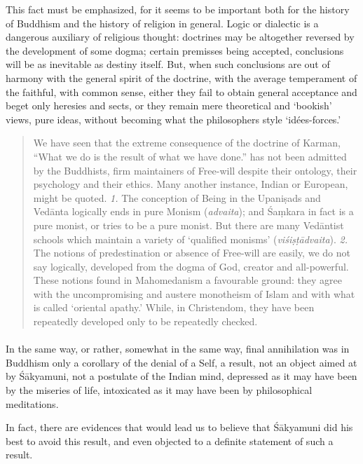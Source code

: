 \documentclass[a4paper, 11pt, oneside, english, landscape]{article}
\begin{document}
This fact must be emphasized, for it seems to be important both for the history of Buddhism and the history of religion in general. Logic or dialectic is a dangerous auxiliary of religious thought: doctrines may be altogether reversed by the development of some dogma; certain premisses being accepted, conclusions will be as inevitable as destiny itself. But, when such conclusions are out of harmony with the general spirit of the doctrine, with the average temperament of the faithful, with common sense, either they fail to obtain general acceptance and beget only heresies and sects, or they remain mere theoretical and `bookish' views, pure ideas, without becoming what the philosophers style `idées-forces.'
\begin{quotation}
\small
We have seen that the extreme consequence of the doctrine of Karman, ``What we do is the result of what we have done.'' has not been admitted by the Buddhists, firm maintainers of Free-will despite their ontology, their psychology and their ethics. Many another instance, Indian or European, might be quoted. \emph{1.} The conception of Being in the Upaniṣads and Vedānta logically ends in pure Monism (\emph{advaita}); and Śaṃkara in fact is a pure monist, or tries to be a pure monist. But there are many Vedāntist schools which maintain a variety of `qualified monisms' (\emph{viśiṣṭādvaita}). \emph{2.} The notions of predestination or absence of Free-will are easily, we do not say logically, developed from the dogma of God, creator and all-powerful. These notions found in Mahomedanism a favourable ground: they agree with the uncompromising and austere monotheism of Islam and with what is called `oriental apathy.' While, in Christendom, they have been repeatedly developed only to be repeatedly checked.
\end{quotation}
\paragraph{}
In the same way, or rather, somewhat in the same way, final annihilation was in Buddhism only a corollary of the denial of a Self, a result, not an object aimed at by Śākyamuni, not a postulate of the Indian mind, depressed as it may have been by the miseries of life, intoxicated as it may have been by philosophical meditations.

In fact, there are evidences that would lead us to believe that Śākyamuni did his best to avoid this result, and even objected to a definite statement of such a result.
\end{document}
